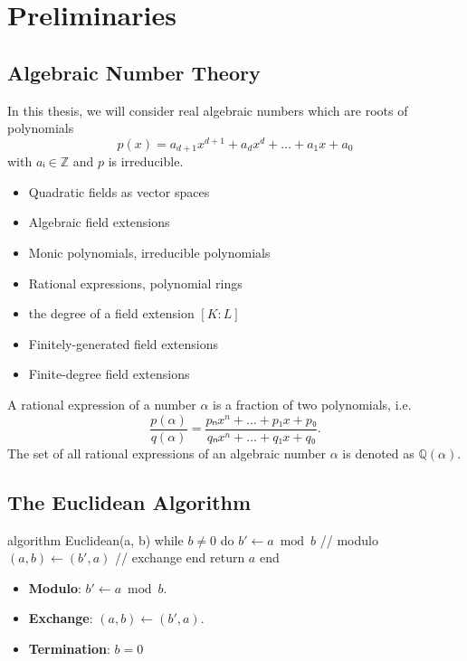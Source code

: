 \chapter{Preliminaries}
\label{ch:preliminaries}

\section{Algebraic Number Theory}

In this thesis, we will consider real algebraic numbers which are roots of polynomials
\[
  p(x) = a_{d+1} x^{d+1} + a_d x^d + \dots + a_1 x + a_0
\]
with $aᵢ ∈ ℤ$ and $p$ is irreducible.

\begin{itemize}
  \item Quadratic fields as vector spaces
  \item Algebraic field extensions
  \item Monic polynomials, irreducible polynomials
  \item Rational expressions, polynomial rings
  \item the degree of a field extension $[K : L]$
  \item Finitely-generated field extensions
  \item Finite-degree field extensions
\end{itemize}

A rational expression of a number $α$ is a fraction of two polynomials, i.e.
\[
  \frac{p(α)}{q(α)} = \frac{pₙ x^n + \dots + p₁ x + p₀}{qₙ x^n + \dots + q₁ x + q₀}.
\]
The set of all rational expressions of an algebraic number $α$ is denoted as $ℚ(α)$.

\section{The Euclidean Algorithm}

\begin{Pseudocode}
algorithm Euclidean(a, b)
  while $b ≠ 0$ do
    $b' ← a \bmod b$ // modulo
    $(a, b) ← (b', a)$ // exchange
  end
  return $a$
end
\end{Pseudocode}

\begin{itemize}
  \item \textbf{Modulo}: $b' ← a \bmod b$.
  \item \textbf{Exchange}: $(a, b) ← (b', a)$.
  \item \textbf{Termination}: $b = 0$
\end{itemize}

